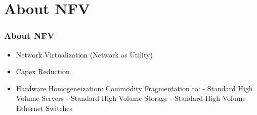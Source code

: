 \section{About NFV}

\begin{frame}[allowframebreaks]
\frametitle{About NFV}

\begin{itemize}
 \item Network Virtualization (Network as Utility)
 \item Capex Reduction
 \item Hardware Homogeneization: Commodity Fragmentation to:\linebreak
	- Standard High Volume Servers\linebreak
	- Standard High Volume Storage\linebreak
	- Standard High Volume Ethernet Switches
\end{itemize}

\end{frame}

